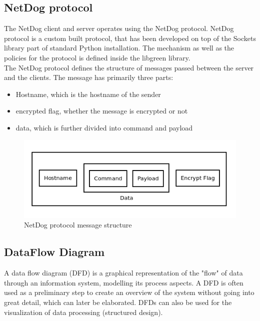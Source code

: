 \subsection{NetDog protocol}
\par
The NetDog client and server operates using the NetDog protocol. NetDog protocol
is a custom built protocol, that has been developed on top of the Sockets
library part of standard Python installation. The mechanism as well as the
policies for the protocol is defined inside the libgreen library.\\

The NetDog protocol defines the structure of messages passed between the server
and the clients. The message has primarily three parts:

\begin{itemize}
    \item Hostname, which is the hostname of the sender
    \item encrypted flag, whether the message is encrypted or not
    \item data, which is further divided into command and payload
\end{itemize}

\begin{figure}[H]
\centering
\includegraphics[scale=0.6]{protocol}
\caption{NetDog protocol message structure}
\end{figure}

\subsection{DataFlow Diagram}
A data flow diagram (DFD) is a graphical representation of the "flow" of data
through an information system, modelling its process aspects. A DFD is often
used as a preliminary step to create an overview of the system without going
into great detail, which can later be elaborated. DFDs can also be used for the
visualization of data processing (structured design).\\

